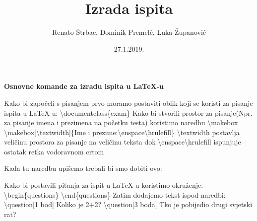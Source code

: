 \documentclass{beamer}
\title{Izrada ispita}
\date{27.1.2019.}
\author{Renato Štrbac, Dominik Premelč, Luka Županović}
\begin{document}
\maketitle
\tableofcontents

%
%
%
%
\begin{frame}
	\begin{center}
		\textbf{Osnovne komande za izradu ispita u LaTeX-u}
	\end{center}
\end{frame}

\begin{frame}
Kako bi započeli s pisanjem prvo moramo postaviti oblik koji se koristi za pisanje ispita u LaTeX-u:
\newline
\newline
\color{blue}
\textbackslash{documentclass\{exam\}}
\color{black}
\newline
\newline
Kako bi stvorili prostor za pisanje(Npr. za pisanje imena i prezimena na početku testa) koristimo naredbu \textbackslash{makebox}
\newline
\newline
\color{blue}
\textbackslash{makebox[\textbackslash{textwidth}]}\{Ime i prezime:\textbackslash{enspace\textbackslash{hrulefill}}\}
\color{black}
\newline
\newline
\textbackslash{textwidth} postavlja veličinu prostora za pisanje na veličinu teksta dok \textbackslash{enspace\textbackslash{hrulefill}} ispunjuje ostatak retka vodoravnom crtom
\end{frame}

\begin{frame}
Kada tu naredbu upišemo trebali bi smo dobiti ovo:
\newline
\newline
{}
\end{frame}

\begin{frame}
Kako bi postavili pitanja za ispit u LaTeX-u koristimo okruženje:
\newline
\newline
\color{blue}
\textbackslash{begin\{questions\}}
\color{black}
\color{blue}
\newline
\newline
\textbackslash{end\{questions\}}
\color{black}
\newline
\newline
Zatim dodajemo tekst ispod naredbi:
\newline
\newline
\color{blue}
\textbackslash{question[1 bod]}
\color{black}
\newline
Koliko je 2+2?
\newline
\newline
\color{blue}
\textbackslash{question[3 boda]}
\color{black}
\newline
Tko je pobijedio drugi svjetski rat?

\end{frame}
\end{document}
